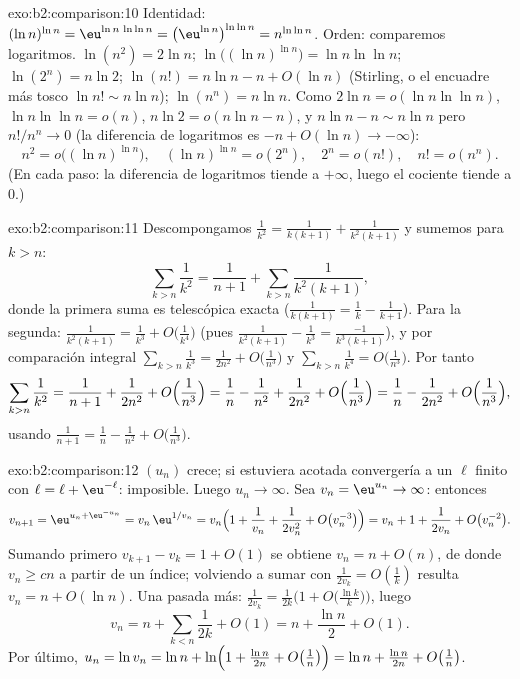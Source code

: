 \begin{solution}{exo:b2:comparison:10}
Identidad: $(\ln n)^{\ln n} = \eu^{\ln n\,\ln\ln n} =
\bigl(\eu^{\ln n}\bigr)^{\ln\ln n} = n^{\ln\ln n}$. Orden:
comparemos logaritmos. $\ln(n^2) = 2\ln n$; $\ln\bigl((\ln
n)^{\ln n}\bigr) = \ln n\ln\ln n$; $\ln(2^n) = n\ln2$; $\ln(n!)
= n\ln n - n + O(\ln n)$ (Stirling, o el encuadre más tosco $\ln
n! \sim n\ln n$); $\ln(n^n) = n\ln n$. Como $2\ln n = o(\ln
n\ln\ln n)$, $\ln n\ln\ln n = o(n)$, $n\ln 2 = o(n\ln n - n)$, y
$n \ln n - n \sim n\ln n$ pero $n! / n^n \to 0$ (la diferencia
de logaritmos es $-n + O(\ln n) \to -\infty$):
\[
n^2 = o\bigl((\ln n)^{\ln n}\bigr),\quad
(\ln n)^{\ln n} = o(2^n),\quad
2^n = o(n!),\quad
n! = o(n^n).
\]
(En cada paso: la diferencia de logaritmos tiende a $+\infty$,
luego el cociente tiende a $0$.)
\end{solution}

\begin{solution}{exo:b2:comparison:11}
Descompongamos $\frac1{k^2} = \frac1{k(k+1)} + \frac1{k^2(k+1)}$
y sumemos para $k > n$:
\[
\sum_{k>n}\frac1{k^2} = \frac1{n+1} +
\sum_{k>n}\frac{1}{k^2(k+1)} ,
\]
donde la primera suma es telescópica exacta ($\frac1{k(k+1)} =
\frac1k - \frac1{k+1}$). Para la segunda: $\frac{1}{k^2(k+1)} =
\frac1{k^3} + O\bigl(\frac1{k^4}\bigr)$ (pues
$\frac{1}{k^2(k+1)} - \frac1{k^3} = \frac{-1}{k^3(k+1)}$), y por
comparación integral $\sum_{k>n}\frac1{k^3} = \frac1{2n^2} +
O\bigl(\frac1{n^3}\bigr)$ y $\sum_{k>n}\frac1{k^4} =
O\bigl(\frac1{n^3}\bigr)$. Por tanto
\[
\sum_{k>n}\frac1{k^2}
= \frac1{n+1} + \frac{1}{2n^2} + O\Bigl(\frac1{n^3}\Bigr)
= \frac1n - \frac1{n^2} + \frac{1}{2n^2} +
O\Bigl(\frac1{n^3}\Bigr)
= \frac1n - \frac{1}{2n^2} + O\Bigl(\frac1{n^3}\Bigr),
\]
usando $\frac1{n+1} = \frac1n - \frac1{n^2} +
O\bigl(\frac1{n^3}\bigr)$.
\end{solution}

\begin{solution}{exo:b2:comparison:12}
$(u_n)$ crece; si estuviera acotada convergería a un $\ell$
finito con $\ell = \ell + \eu^{-\ell}$: imposible. Luego $u_n \to
\infty$. Sea $v_n = \eu^{u_n} \to \infty$: entonces
\[
v_{n+1} = \eu^{u_n + \eu^{-u_n}} = v_n\,\eu^{1/v_n}
= v_n\Bigl(1 + \frac1{v_n} + \frac1{2v_n^2} +
O\bigl(v_n^{-3}\bigr)\Bigr)
= v_n + 1 + \frac{1}{2v_n} + O\bigl(v_n^{-2}\bigr).
\]
Sumando primero $v_{k+1} - v_k = 1 + O(1)$ se obtiene $v_n = n +
O(n)$, de donde $v_n \geq cn$ a partir de un índice; volviendo a
sumar con $\frac1{2v_k} = O(\frac1k)$ resulta $v_n = n + O(\ln
n)$. Una pasada más: $\frac{1}{2v_k} = \frac{1}{2k}\bigl(1 +
O\bigl(\tfrac{\ln k}k\bigr)\bigr)$, luego
\[
v_n = n + \sum_{k<n}\frac1{2k} + O(1) = n + \frac{\ln n}2 +
O(1).
\]
Por último, $u_n = \ln v_n = \ln n + \ln\Bigl(1 + \frac{\ln
n}{2n} + O\bigl(\tfrac1n\bigr)\Bigr) = \ln n + \frac{\ln n}{2n} +
O\bigl(\tfrac1n\bigr)$.
\end{solution}

